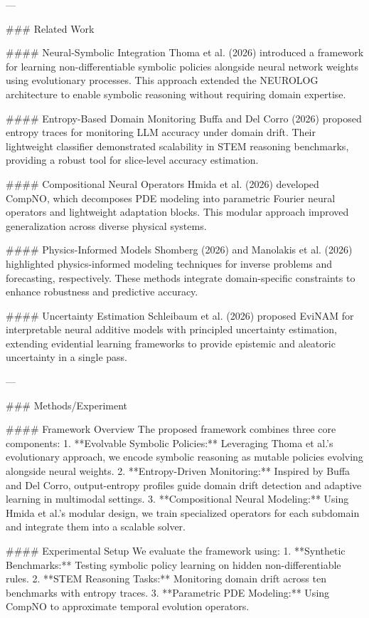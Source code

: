 ---

### Related Work

#### Neural-Symbolic Integration
Thoma et al. (2026) introduced a framework for learning non-differentiable symbolic policies alongside neural network weights using evolutionary processes. This approach extended the NEUROLOG architecture to enable symbolic reasoning without requiring domain expertise.

#### Entropy-Based Domain Monitoring
Buffa and Del Corro (2026) proposed entropy traces for monitoring LLM accuracy under domain drift. Their lightweight classifier demonstrated scalability in STEM reasoning benchmarks, providing a robust tool for slice-level accuracy estimation.

#### Compositional Neural Operators
Hmida et al. (2026) developed CompNO, which decomposes PDE modeling into parametric Fourier neural operators and lightweight adaptation blocks. This modular approach improved generalization across diverse physical systems.

#### Physics-Informed Models
Shomberg (2026) and Manolakis et al. (2026) highlighted physics-informed modeling techniques for inverse problems and forecasting, respectively. These methods integrate domain-specific constraints to enhance robustness and predictive accuracy.

#### Uncertainty Estimation
Schleibaum et al. (2026) proposed EviNAM for interpretable neural additive models with principled uncertainty estimation, extending evidential learning frameworks to provide epistemic and aleatoric uncertainty in a single pass.

---

### Methods/Experiment

#### Framework Overview
The proposed framework combines three core components:
1. **Evolvable Symbolic Policies:** Leveraging Thoma et al.'s evolutionary approach, we encode symbolic reasoning as mutable policies evolving alongside neural weights.
2. **Entropy-Driven Monitoring:** Inspired by Buffa and Del Corro, output-entropy profiles guide domain drift detection and adaptive learning in multimodal settings.
3. **Compositional Neural Modeling:** Using Hmida et al.'s modular design, we train specialized operators for each subdomain and integrate them into a scalable solver.

#### Experimental Setup
We evaluate the framework using:
1. **Synthetic Benchmarks:** Testing symbolic policy learning on hidden non-differentiable rules.
2. **STEM Reasoning Tasks:** Monitoring domain drift across ten benchmarks with entropy traces.
3. **Parametric PDE Modeling:** Using CompNO to approximate temporal evolution operators.


